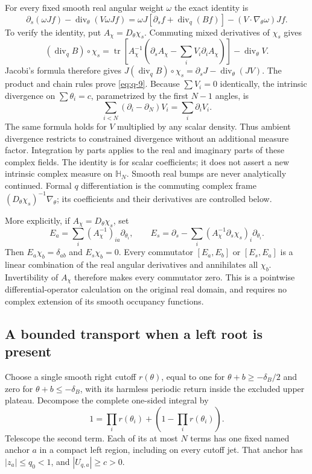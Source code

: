 \documentclass[11pt]{article}
\numberwithin{equation}{section}
\theoremstyle{remark}\newtheorem{remark}[theorem]{Remark}
\begin{document}
For every fixed smooth real angular weight $\omega$ the exact identity
is
\begin{equation}\label{eq:q-9}
\partial_s(\omega Jf)-\operatorname{div}_\theta(V\omega Jf)
 =\omega J[\partial_sf+\operatorname{div}_q(Bf)]
    -(V\cdot\nabla_\theta\omega)Jf.
\end{equation}
To verify the identity, put $A_\chi=D_\theta\chi_s$.
Commuting mixed derivatives of $\chi_s$ gives
\[
 (\operatorname{div}_qB)\circ\chi_s
 =\operatorname{tr}\!\left[A_\chi^{-1}
   \left(\partial_sA_\chi-\sum_iV_i\partial_iA_\chi\right)\right]
     -\operatorname{div}_\theta V.
\]
Jacobi's formula therefore gives
$J(\operatorname{div}_qB)\circ\chi_s
=\partial_sJ-\operatorname{div}_\theta(JV)$.
The product and chain rules prove \eqref{eq:q-9}. Because $\sum V_i=0$ identically, the intrinsic divergence on
$\sum\theta_i=c$, parametrized by the first $N-1$ angles, is
\[
 \sum_{i<N}(\partial_i-\partial_N)V_i=\sum_i\partial_iV_i.
\]
The same formula holds for $V$ multiplied by any scalar density.
Thus ambient divergence restricts to constrained divergence without
an additional measure factor. Integration by parts applies to the
real and imaginary parts of these complex fields.
The identity is for scalar coefficients; it does not assert a new
intrinsic complex measure on $\mathbb H_N$. Smooth real bumps are
never analytically continued. Formal $q$ differentiation is the
commuting complex frame $(D_\theta\chi_s)^{-1}\nabla_\theta$; its
coefficients and their derivatives are controlled below.

More explicitly, if $A_\chi=D_\theta\chi_s$, set
\[
 E_a=\sum_i(A_\chi^{-1})_{ia}\partial_{\theta_i},\qquad
 E_s=\partial_s-
       \sum_i(A_\chi^{-1}\partial_s\chi_s)_i\partial_{\theta_i}.
\]
Then $E_a\chi_b=\delta_{ab}$ and $E_s\chi_b=0$. Every commutator
$[E_a,E_b]$ or $[E_s,E_a]$ is a linear combination of the real
angular derivatives and annihilates all $\chi_b$. Invertibility of
$A_\chi$ therefore makes every commutator zero. This is a pointwise
differential-operator calculation on the original real domain, and
requires no complex extension of its smooth occupancy functions.

\subsection{A bounded transport when a left root is present}\label{sec:left-gap}

Choose a single smooth right cutoff $r(\theta)$, equal to one for
$\theta+b\ge-\delta_B/2$ and zero for
$\theta+b\le-\delta_B$, with its harmless periodic return inside the
excluded upper plateau. Decompose the complete one-sided integral by
\[
 1=\prod_i r(\theta_i)+\left(1-\prod_i r(\theta_i)\right).
\]
Telescope the second term. Each of its at most $N$ terms has one fixed
named anchor $a$ in a compact left region, including on every cutoff
jet. That anchor has $|z_a|\le q_0<1$, and $|U_{q,a}|\ge c>0$.
\end{document}
